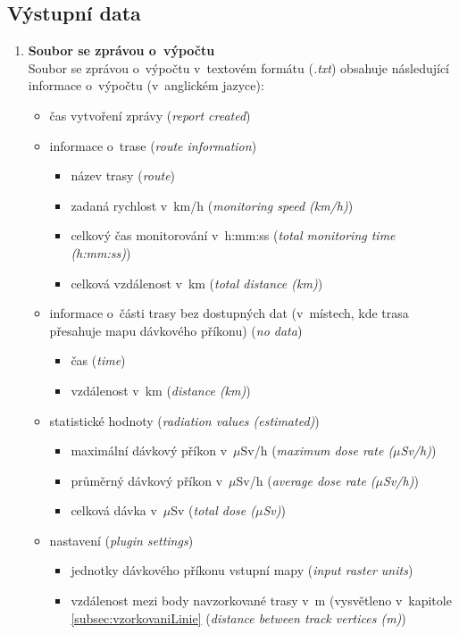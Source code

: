 \subsection{Výstupní data}
\label{sec:VystupniData}
\begin{enumerate}
	\item \textbf{Soubor se zprávou o~výpočtu} \\
	Soubor se zprávou o~výpočtu v~textovém formátu (\textit{.txt}) obsahuje následující informace o~výpočtu (v~anglickém jazyce):
		\begin{itemize}
			\item čas vytvoření zprávy (\textit{report created})
			
			\item informace o~trase (\textit{route information})
			\begin{itemize}
				\item název trasy (\textit{route})
				\item zadaná rychlost v~km/h (\textit{monitoring speed (km/h)})
				\item celkový čas monitorování v~h:mm:ss (\textit{total monitoring time (h:mm:ss)})
				\item celková vzdálenost v~km (\textit{total distance (km)})
			\end{itemize}
			
			\item informace o~části trasy bez dostupných dat (v~místech, kde trasa přesahuje mapu dávkového příkonu) (\textit{no data})
			\begin{itemize}
				\item čas (\textit{time})
				\item vzdálenost v~km (\textit{distance (km)})
			\end{itemize}
			
			\item statistické hodnoty (\textit{radiation values (estimated)})
			\begin{itemize}
				\item maximální dávkový příkon v~$\mu$Sv/h (\textit{maximum dose rate ($\mu$Sv/h)})
				\item průměrný dávkový příkon v~$\mu$Sv/h (\textit{average dose rate ($\mu$Sv/h)})
				\item celková dávka v~$\mu$Sv (\textit{total dose ($\mu$Sv)})
			\end{itemize}
			
			\item nastavení (\textit{plugin settings})
			\begin{itemize}
				\item jednotky dávkového příkonu vstupní mapy (\textit{input raster units})
				\item vzdálenost mezi body navzorkované trasy v~m (vysvětleno v~kapitole \ref{subsec:vzorkovaniLinie} (\textit{distance between track vertices (m)})
			\end{itemize}
			

\end{itemize}
\end{enumerate}
